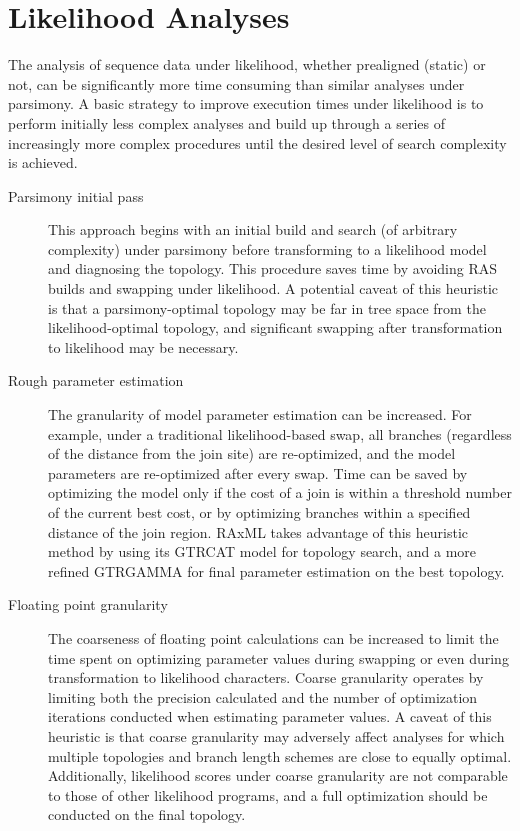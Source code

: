 \section{Likelihood Analyses}
The analysis of sequence data under likelihood, whether prealigned (static) or not, can be significantly more time consuming than 
similar analyses under parsimony.  A basic strategy to improve execution times under likelihood
is to perform initially less complex analyses and build up through a series of increasingly more complex procedures
until the desired level of search complexity is achieved.  
\begin{description}
\item[Parsimony initial pass] This approach begins with an initial build and search (of arbitrary complexity) under parsimony before 
transforming to a likelihood model and diagnosing the topology. This procedure saves time by avoiding RAS builds and 
swapping under likelihood. A potential caveat of this heuristic is that a parsimony-optimal topology may be far in tree space from the
likelihood-optimal topology, and significant swapping after transformation to likelihood may be necessary.

\item[Rough parameter estimation] The granularity of model parameter estimation can be increased. For example, under a traditional 
likelihood-based swap, all branches (regardless of the distance from the join site) are re-optimized, and the model parameters are 
re-optimized after every swap. Time can be saved by optimizing the model only if the cost of a join is within a threshold number 
of the current best cost, or by optimizing branches within a specified distance of the join region. RAxML takes advantage of this 
heuristic method by using its GTRCAT model for topology search, and a more refined GTRGAMMA for final parameter estimation 
on the best topology.

\item[Floating point granularity] The coarseness of floating point calculations can be increased to limit the time spent on optimizing
parameter values during swapping or even during transformation to likelihood characters. Coarse granularity operates by limiting both
the precision calculated and the number of optimization iterations conducted when estimating parameter values. A caveat of this
heuristic is that coarse granularity may adversely affect analyses for which multiple topologies and branch length schemes are close to 
equally optimal. Additionally, likelihood scores under coarse granularity are not comparable to those of other likelihood programs, and
a full optimization should be conducted on the final topology.  


\end{description}
